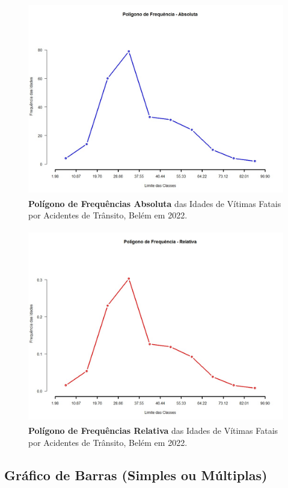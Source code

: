 \newpage

\vspace{-1cm}
\begin{figure}[H]
    \centering
\includegraphics[scale=0.4,height=240pt,width=15cm]{figures/poligono1.jpeg}
    \caption{\textbf{Polígono de Frequências Absoluta} das Idades de Vítimas Fatais por Acidentes de Trânsito, Belém em 2022.}
    \label{fig:my_label25}
\end{figure}

\vspace{-2cm}
\begin{figure}
    \centering
\includegraphics[scale=0.4,height=240pt,width=15cm]{figures/poligono2.jpeg}
    \caption{\textbf{Polígono de Frequências Relativa} das Idades de Vítimas Fatais por Acidentes de Trânsito, Belém em 2022.}
    \label{fig:my_label25}
\end{figure}


\newpage
\subsection{Gráfico de Barras (Simples ou Múltiplas)}


